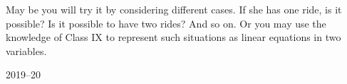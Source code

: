\documentclass{article}
\begin{document}
{\fontsize{13.75}{16}\selectfont
\vspace{1em}
\hspace{1em}
May be you will try it by considering different cases. If she has one ride, is it possible? Is it possible to have two rides? And so on. Or you may use the knowledge of Class IX to represent such situations as linear equations in two variables.
}
\vfill
\begin{center}
    2019--20
\end{center}
\newpage 
\pagestyle{fancy}
\fancyhf{} %
\renewcommand{\headrule}{\color{ncertcyan}\hrule height 3pt}
\end{document}
